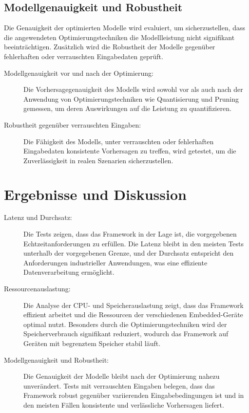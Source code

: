 \subsection{Modellgenauigkeit und Robustheit}

Die Genauigkeit der optimierten Modelle wird evaluiert, um sicherzustellen, dass die angewendeten Optimierungstechniken die Modellleistung 
nicht signifikant beeinträchtigen. Zusätzlich wird die Robustheit der Modelle gegenüber fehlerhaften oder verrauschten Eingabedaten geprüft. 

\begin{description}
    \item[Modellgenauigkeit vor und nach der Optimierung:] Die Vorhersagegenauigkeit des Modells wird sowohl vor als auch 
    nach der Anwendung von Optimierungstechniken wie Quantisierung und Pruning gemessen, um deren Auswirkungen auf die Leistung zu quantifizieren.
    \item[Robustheit gegenüber verrauschten Eingaben:] Die Fähigkeit des Modells, unter verrauschten oder fehlerhaften 
    Eingabedaten konsistente Vorhersagen zu treffen, wird getestet, um die Zuverlässigkeit in realen Szenarien sicherzustellen.
\end{description}

\section{Ergebnisse und Diskussion}

\begin{description}
    \item[Latenz und Durchsatz:] Die Tests zeigen, dass das Framework in der Lage ist, die vorgegebenen Echtzeitanforderungen zu erfüllen. 
    Die Latenz bleibt in den meisten Tests unterhalb der vorgegebenen Grenze, und der Durchsatz entspricht den Anforderungen industrieller Anwendungen, 
    was eine effiziente Datenverarbeitung ermöglicht.
    
    \item[Ressourcenauslastung:] Die Analyse der CPU- und Speicherauslastung zeigt, dass das Framework effizient arbeitet und die Ressourcen 
    der verschiedenen Embedded-Geräte optimal nutzt. Besonders durch die Optimierungstechniken wird der Speicherverbrauch signifikant reduziert, 
    wodurch das Framework auf Geräten mit begrenztem Speicher stabil läuft.
    
    \item[Modellgenauigkeit und Robustheit:] Die Genauigkeit der Modelle bleibt nach der Optimierung nahezu unverändert. 
    Tests mit verrauschten Eingaben belegen, dass das Framework robust gegenüber variierenden Eingabebedingungen 
    ist und in den meisten Fällen konsistente und verlässliche Vorhersagen liefert.
\end{description}

